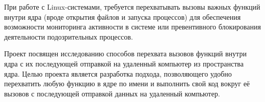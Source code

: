 \Introduction

При работе с Linux-системами, требуется перехватывать вызовы важных функций внутри ядра (вроде открытия файлов и запуска процессов) для обеспечения возможности мониторинга активности в системе или превентивного блокирования деятельности подозрительных процессов.

Проект посвящен исследованию способов перехвата вызовов функций внутри ядра с их последующей отправкой на удаленный компьютер из пространства ядра. Целью проекта является разработка подхода, позволяющего удобно перехватить любую функцию в ядре по имени и выполнить свой код вокруг её вызовов с последующей отправкой данных на удаленный компьютер.